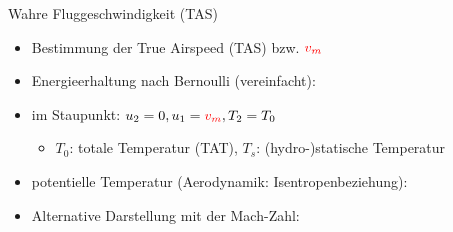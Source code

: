\documentclass[ucs,9pt]{beamer}
\begin{document}
\begin{frame}{Wahre Fluggeschwindigkeit (TAS)}
	\begin{itemize}
		\item<1-> Bestimmung der True Airspeed (TAS) bzw. $\textcolor{red}{v_m}$
		\item<2-> Energieerhaltung nach Bernoulli (vereinfacht):
	\end{itemize}
	\begin{itemize}
		\item<3-> im Staupunkt: $u_2=0, u_1=\textcolor{red}{v_m}, T_2=T_0$
		\begin{itemize}
			\item $T_0$: totale Temperatur (TAT), $T_s$: (hydro-)statische Temperatur
		\end{itemize}
	\end{itemize}
	\begin{itemize}
		\item<4-> potentielle Temperatur (Aerodynamik: Isentropenbeziehung):
	\end{itemize}
	\begin{itemize}
		\item<5-> Alternative Darstellung mit der Mach-Zahl:
	\end{itemize}
\end{frame}
\end{document}
